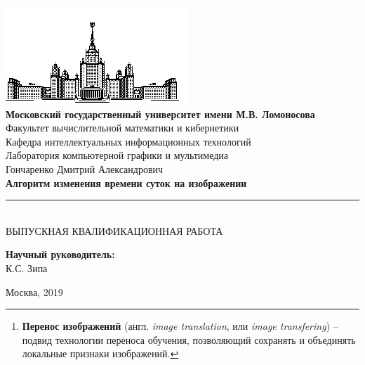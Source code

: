 \documentclass[11pt,a4paper]{extarticle}
\begin{document}
\begin{titlepage}
	\begin{centering}
		\includegraphics{img/msu}\\
		\large{
			\textbf{Московский государственный университет имени М.В. Ломоносова}\\
			Факультет вычислительной математики и кибернетики\\
			Кафедра интеллектуальных информационных технологий\\
			Лаборатория компьютерной графики и мультимедиа\\[4cm]
		}
		\Large{
			Гончаренко Дмитрий Александрович\\[0.9cm]
		}
		\Large{
			\textbf{Алгоритм изменения времени суток на изображении}\\
		}
		\rule[0.3cm]{14cm}{0.02cm}\\[1cm]
		\large{
			ВЫПУСКНАЯ КВАЛИФИКАЦИОННАЯ РАБОТА\\[4cm]
		}
	\end{centering}
	\begin{flushright}
		\large{
			\textbf{Научный руководитель:}\\ К.С. Зипа\\
		}
	\end{flushright}
	\begin{center}
		\vfill
		\large{
			Москва, 2019
		}
	\end{center}
\end{titlepage}

\begin{abstract}
	Алгоритм изменения времени суток на изображении относится к классу задач машинного обучения по \textit{переносу
	изображений}\footnote{
		\textbf{Перенос изображений} (англ. \textit{image translation}, или \textit{image transfering})
		-- подвид технологии переноса обучения, позволяющий сохранять и объединять локальные признаки изображений.
	}.
	Данная сфера значительное продвинулась благодаря современным вычислительным возможностям, в частности переносе обучения на графические процессоры, GPU.
	За последние несколько лет появилось немало исследовательских работ на тему переноса изображений, стилей и колоризации.
	В данной работе рассматриваются современные подходы к переносу изображений, применимые к задаче изменения времени суток на изображении.
	Проводится описание нейросетевых моделей, обоснование и выбор метода для обучения и сравнительный анализ серии экспериментов обучения.
\end{abstract}
\end{document}
